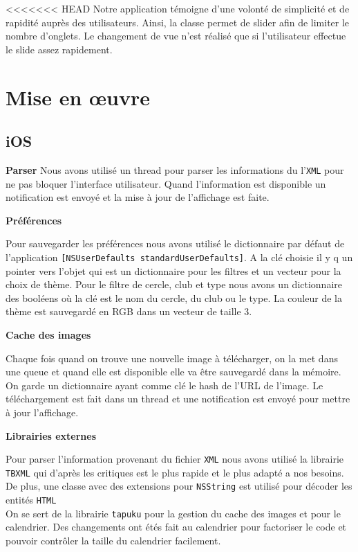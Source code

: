 \documentclass[a4paper, 11px]{article}
\begin{document}
<<<<<<< HEAD
Notre application témoigne d'une volonté de simplicité et de rapidité auprès des utilisateurs. Ainsi, la classe  permet de \og slider \fg afin de limiter le nombre d'onglets. Le changement de vue n'est réalisé que si l'utilisateur effectue le slide assez rapidement.

\section{Mise en œuvre}

\subsection{iOS}
{\bf Parser}
Nous avons utilisé un thread pour parser les informations du l'\texttt{XML} pour ne pas bloquer l'interface utilisateur. Quand l'information est disponible un notification est envoyé et la mise à jour de l'affichage est faite.


{\bf Préférences}

Pour sauvegarder les préférences nous avons utilisé le dictionnaire par défaut de l'application 
\texttt{[NSUserDefaults standardUserDefaults]}. A la clé choisie il y q un pointer vers l'objet qui est un dictionnaire pour les filtres et un vecteur pour la choix de thème. Pour le filtre de cercle, club et type nous avons un dictionnaire des booléens où la clé est le nom du cercle, du club ou le type. La couleur de la thème est sauvegardé en RGB dans un vecteur de taille 3. 
 
{\bf Cache des images}

Chaque fois quand on trouve une nouvelle image à télécharger, on la met dans une queue et quand elle est disponible elle va être sauvegardé dans la mémoire. On garde un dictionnaire ayant comme clé le hash de l'URL de l'image. Le téléchargement est fait dans un thread et une notification est envoyé pour mettre à jour l'affichage.

{\bf Librairies externes}

Pour parser l'information provenant du fichier \texttt{XML} nous avons utilisé la librairie \texttt{TBXML} qui d'après les critiques est le plus rapide et le plus adapté a nos besoins. De plus, une classe avec des extensions pour \texttt{NSString} est utilisé pour décoder les entités \texttt{HTML}\\
\indent On se sert de la librairie \texttt{tapuku} pour la gestion du cache des images et pour le calendrier. Des changements ont étés fait au calendrier pour factoriser le code et pouvoir contrôler la taille du calendrier facilement.
\end{document}

